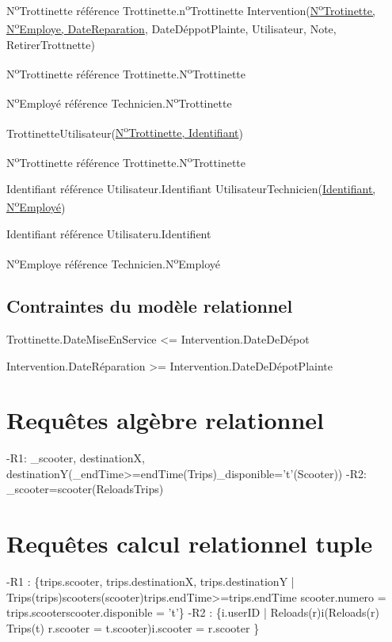 \documentclass{article}
\newcommand\tab[1][1cm]{\hspace*{#1}}
\begin{document}
\tab N\textsuperscript{o}Trottinette référence Trottinette.n\textsuperscript{o}Trottinette
 \bigbreak
 Intervention(\underline{N\textsuperscript{o}Trotinette, N\textsuperscript{o}Employe, DateReparation}, DateDéppotPlainte, Utilisateur, Note, RetirerTrottnette)
 
 \tab N\textsuperscript{o}Trottinette référence Trottinette.N\textsuperscript{o}Trottinette
 
\tab N\textsuperscript{o}Employé référence Technicien.N\textsuperscript{o}Trottinette

\bigbreak
TrottinetteUtilisateur(\underline{N\textsuperscript{o}Trottinette, Identifiant})

\tab N\textsuperscript{o}Trottinette référence Trottinette.N\textsuperscript{o}Trottinette

\tab Identifiant référence Utilisateur.Identifiant
\bigbreak
UtilisateurTechnicien(\underline{Identifiant, N\textsuperscript{o}Employé})

\tab Identifiant référence Utilisateru.Identifient

\tab N\textsuperscript{o}Employe référence Technicien.N\textsuperscript{o}Employé

\subsection*{Contraintes du modèle relationnel}
Trottinette.DateMiseEnService <= Intervention.DateDeDépot

Intervention.DateRéparation >= Intervention.DateDeDépotPlainte

\section{Requêtes algèbre relationnel}
-R1: \pi_{scooter, destinationX, destinationY}(\sigma_{endTime>=endTime}(Trips)\cap \sigma_{disponible='t'}(Scooter))
\bigbreak
-R2: \sigma_{scooter=scooter}(Reloads\cap Trips)

\section{Requêtes calcul relationnel tuple}
-R1 : \hspace{-0.2cm}\{trips.scooter, trips.destinationX, trips.destinationY | Trips(trips)\land scooters(scooter)\land trips.endTime>=\forall trips.endTime \land scooter.numero = trips.scooter\land scooter.disponible = 't'\}
\bigbreak
-R2 : \hspace{-0.2cm}\{i.userID | Reloads(r)\land i(Reloads(r) \land Trips(t) \land r.scooter = t.scooter)\land \forall i.scooter =  \forall r.scooter   \}
\end{document}
